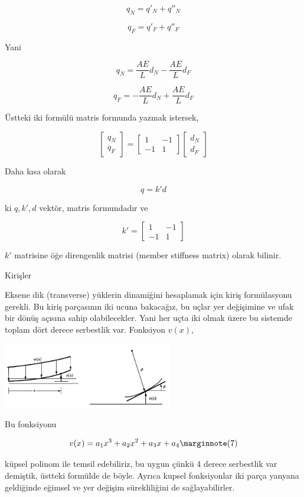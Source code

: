 \documentclass[12pt,fleqn]{article}\usepackage{../../common}
\begin{document}
$$
q_N = q'_N + q''_N 
$$

$$
q_F = q'_F + q''_F
$$

Yani

$$
q_N = \frac{AE}{L} d_N - \frac{AE}{L} d_F
$$

$$
q_F = -\frac{AE}{L} d_N + \frac{AE}{L} d_F
$$

Üstteki iki formülü matris formunda yazmak istersek,

$$
\left[\begin{array}{c}
q_N \\ q_F
\end{array}\right] =
\left[\begin{array}{cc}
1 & -1 \\ -1 & 1
\end{array}\right]
\left[\begin{array}{c}
d_N \\ d_F
\end{array}\right] 
$$

Daha kısa olarak

$$
q = k' d
$$

ki $q,k',d$ vektör, matris formundadır ve

$$
k' = \left[\begin{array}{cc}
1 & -1 \\ -1 & 1
\end{array}\right]
$$

$k'$ matrisine öğe direngenlik matrisi (member stiffness matrix) olarak bilinir.

Kirişler

Eksene dik (transverse) yüklerin dinamiğini hesaplamak için kiriş formülasyonu
gerekli. Bu kiriş parçasının iki ucuna bakacağız, bu uçlar yer değişimine ve
ufak bir dönüş açısına sahip olabilecekler. Yani her uçta iki olmak üzere
bu sistemde toplam dört derece serbestlik var. Fonksiyon $v(x)$,

\includegraphics[width=20em]{phy_020_strs_05_09.jpg}

Bu fonksiyonu

$$
v(x) = a_1 x^3 + a_2 x^2 + a_3 x + a_4
\mlabel{7}
$$

küpsel polinom ile temsil edebiliriz, bu uygun çünkü 4 derece serbestlik var
demiştik, üstteki formülde de böyle. Ayrıca kupsel fonksiyonlar iki parça
yanyana geldiğinde eğimsel ve yer değişim sürekliliğini de sağlayabilirler.
\end{document}
